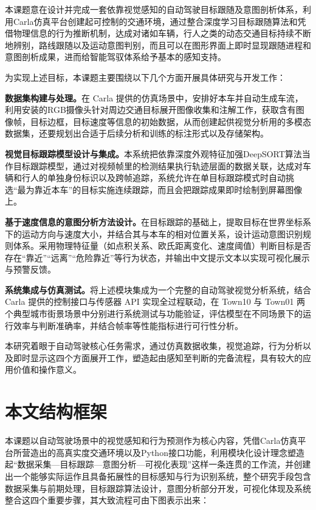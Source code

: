 本课题意在设计并完成一套依靠视觉感知的自动驾驶目标跟随及意图剖析体系，利用Carla仿真平台创建起可控制的交通环境，通过整合深度学习目标跟随算法和凭借物理信息的行为推断机制，达成对诸如车辆，行人之类的动态交通目标持续不断地辨别，路线跟随以及运动意图判别，而且可以在图形界面上即时显现跟随进程和意图剖析成果，进而给智能驾驭体系给予基本的感知支持。

为实现上述目标，本课题主要围绕以下几个方面开展具体研究与开发工作：

\textbf{数据集构建与处理。}在 Carla 提供的仿真场景中，安排好本车并自动生成车流，利用安装的RGB摄像头针对周边交通目标展开图像收集和注解工作，获取含有图像帧，目标边框，目标速度等信息的初始数据，从而创建起供视觉分析用的多模态数据集，还要规划出合适于后续分析和训练的标注形式以及存储架构。

\textbf{视觉目标跟踪模型设计与集成。}本系统把依靠深度外观特征加强DeepSORT算法当作目标跟踪模型，通过对视频帧里的检测结果执行轨迹层面的数据关联，达成对车辆和行人的单独身份标识以及跨帧追踪，系统允许在单目标跟踪模式时自动挑选“最为靠近本车”的目标实施连续跟踪，而且会把跟踪成果即时绘制到屏幕图像上。

\textbf{基于速度信息的意图分析方法设计。}在目标跟踪的基础上，提取目标在世界坐标系下的运动方向与速度大小，并结合其与本车的相对位置关系，设计运动意图识别规则体系。采用物理特征量（如点积关系、欧氏距离变化、速度阈值）判断目标是否存在“靠近”“远离”“危险靠近”等行为状态，并输出中文提示文本以实现可视化展示与预警反馈。

\textbf{系统集成与仿真测试。}将上述模块集成为一个完整的自动驾驶视觉分析系统，结合 Carla 提供的控制接口与传感器 API 实现全过程联动，在 Town10 与 Town01 两个典型城市街景场景中分别进行系统测试与功能验证，评估模型在不同场景下的运行效率与判断准确率，并结合帧率等性能指标进行可行性分析。

本研究着眼于自动驾驶核心任务需求，通过仿真数据收集，视觉追踪，行为分析以及即时显示这四个方面展开工作，塑造起由感知至判断的完备流程，具有较大的应用价值和操作意义。

\section{本文结构框架}

本课题以自动驾驶场景中的视觉感知和行为预测作为核心内容，凭借Carla仿真平台所营造出的高真实度交通环境以及Python接口功能，利用模块化设计理念塑造起“数据采集—目标跟踪—意图分析—可视化表现”这样一条连贯的工作流，并创建出一个能够实际运作且具备拓展性的目标感知与行为识别系统，整个研究手段包含数据采集与前期处理，目标跟踪算法设计，意图分析部分开发，可视化体现及系统整合这四个重要步骤，其大致流程可由下图表示出来：

